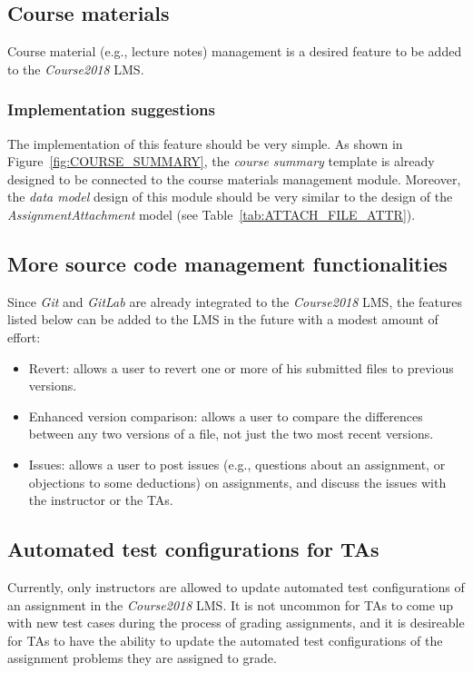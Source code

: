 \subsection{Course materials}
Course material (e.g., lecture notes) management is a desired feature to be
added to the \emph{Course2018} LMS\null.

\subsubsection{Implementation suggestions}
The implementation of this feature should be very simple.
As shown in
Figure~\ref{fig:COURSE_SUMMARY}, the \emph{course summary} template is already
designed to be connected to the course materials management module.
Moreover, the \emph{data model} design of this module should
be very similar to the design of the \emph{AssignmentAttachment} model 
(see Table~\ref{tab:ATTACH_FILE_ATTR}).

\subsection{More source code management functionalities}
Since \emph{Git} and \emph{GitLab} are already integrated to the
\emph{Course2018} LMS, the features listed below can be added to the LMS in the
future with a modest amount of effort:
\begin{itemize}
    \item Revert: allows a user to revert one or more of his submitted files to
        previous versions.
    \item Enhanced version comparison: allows a user to compare the differences
        between any two versions of a file, not just the two most recent
        versions.
    \item Issues: allows a user to post issues (e.g., questions about an
        assignment, or objections to some deductions) on assignments, and
        discuss the issues with the instructor or the TAs.
\end{itemize}

\subsection{Automated test configurations for TAs}
Currently, only instructors are allowed to update automated test
configurations of an assignment in the \emph{Course2018} LMS\null.
It is not uncommon for TAs to come up with new test
cases during the process of grading assignments, and it is desireable for TAs
to have the ability to update the automated test configurations of the
assignment problems they are assigned to grade.

